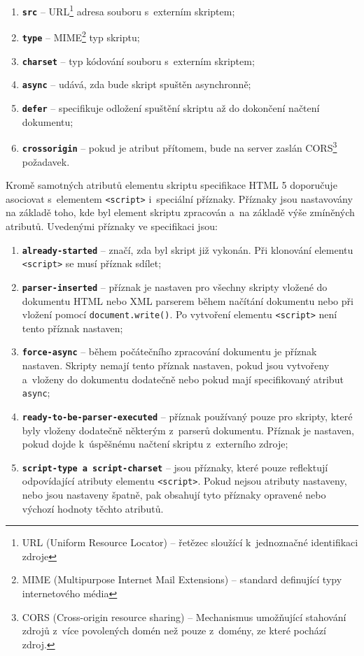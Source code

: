 \begin{enumerate}
  \item \textbf{\texttt{src}} -- URL\footnote{URL (Uniform Resource Locator) -- řetězec sloužící k~jednoznačné identifikaci zdroje} adresa souboru s~externím skriptem;
  \item \textbf{\texttt{type}} -- MIME\footnote{MIME (Multipurpose Internet Mail Extensions) -- standard definující typy internetového média} typ skriptu;
  \item \textbf{\texttt{charset}} -- typ kódování souboru s~externím skriptem;
  \item \textbf{\texttt{async}} -- udává, zda bude skript spuštěn asynchronně;
  \item \textbf{\texttt{defer}} -- specifikuje odložení spuštění skriptu až do dokončení načtení dokumentu;
  \item \textbf{\texttt{crossorigin}} -- pokud je atribut přítomem, bude na server zaslán CORS\footnote{CORS (Cross-origin resource sharing) -- Mechanismus umožňující stahování zdrojů z~více povolených domén než pouze z~domény, ze které pochází zdroj.} požadavek. 
\end{enumerate}

Kromě samotných atributů elementu skriptu specifikace HTML 5 doporučuje asociovat s~elementem \texttt{<script>} i~speciální příznaky. Příznaky jsou nastavovány na základě toho, kde byl element skriptu zpracován a~na základě výše zmíněných atributů. Uvedenými příznaky ve specifikaci jsou:

\begin{enumerate}
  \item \textbf{\texttt{already-started}} -- značí, zda byl skript již vykonán. Při klonování elementu \texttt{<script>} se musí příznak sdílet;
  \item \textbf{\texttt{parser-inserted}} -- příznak je nastaven pro všechny skripty vložené do dokumentu HTML nebo XML parserem během načítání dokumentu nebo při vložení pomocí \texttt{document.write()}. Po vytvoření elementu \texttt{<script>} není tento příznak nastaven;
  \item \textbf{\texttt{force-async}} -- během počátečního zpracování dokumentu je příznak nastaven. Skripty nemají tento příznak nastaven, pokud jsou vytvořeny a~vloženy do dokumentu dodatečně nebo pokud mají specifikovaný atribut \texttt{async};
  \item \textbf{\texttt{ready-to-be-parser-executed}} -- příznak používaný pouze pro skripty, které byly vloženy dodatečně některým z~parserů dokumentu. Příznak je nastaven, pokud dojde k~úspěšnému načtení skriptu z~externího zdroje;
  \item \textbf{\texttt{script-type a~script-charset}} -- jsou příznaky, které pouze reflektují odpovídající atributy elementu \texttt{<script>}. Pokud nejsou atributy nastaveny, nebo jsou nastaveny špatně, pak obsahují tyto příznaky opravené nebo výchozí hodnoty těchto atributů.
\end{enumerate}

